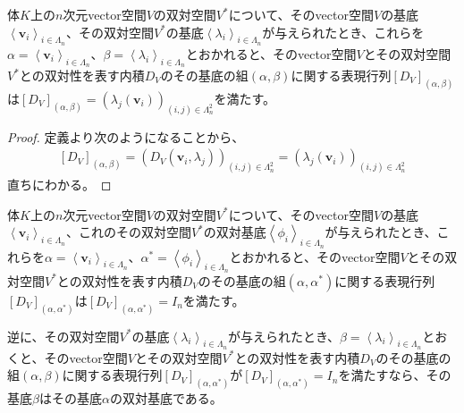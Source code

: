\documentclass[dvipdfmx]{jsarticle}
\begin{document}
\begin{thm}\label{2.4.3.11}
体$K$上の$n$次元vector空間$V$の双対空間$V^{*}$について、そのvector空間$V$の基底$\left\langle \mathbf{v}_{i} \right\rangle_{i \in \varLambda_{n}}$、その双対空間$V^{*}$の基底$\left\langle \lambda_{i} \right\rangle_{i \in \varLambda_{n}}$が与えられたとき、これらを$\alpha = \left\langle \mathbf{v}_{i} \right\rangle_{i \in \varLambda_{n}}$、$\beta = \left\langle \lambda_{i} \right\rangle_{i \in \varLambda_{n}}$とおかれると、そのvector空間$V$とその双対空間$V^{*}$との双対性を表す内積$D_{V}$のその基底の組$(\alpha,\beta)$に関する表現行列$\left[ D_{V} \right]_{(\alpha,\beta)}$は$\left[ D_{V} \right]_{(\alpha,\beta)} = \left( \lambda_{j}\left( \mathbf{v}_{i} \right) \right)_{(i,j) \in \varLambda_{n}^{2}}$を満たす。
\end{thm}
\begin{proof}
定義より次のようになることから、
\begin{align*}
\left[ D_{V} \right]_{(\alpha,\beta)} = \left( D_{V}\left( \mathbf{v}_{i},\lambda_{j} \right) \right)_{(i,j) \in \varLambda_{n}^{2}} = \left( \lambda_{j}\left( \mathbf{v}_{i} \right) \right)_{(i,j) \in \varLambda_{n}^{2}}
\end{align*}
直ちにわかる。
\end{proof}
\begin{thm}\label{2.4.3.12}
体$K$上の$n$次元vector空間$V$の双対空間$V^{*}$について、そのvector空間$V$の基底$\left\langle \mathbf{v}_{i} \right\rangle_{i \in \varLambda_{n}}$、これのその双対空間$V^{*}$の双対基底$\left\langle \phi_{i} \right\rangle_{i \in \varLambda_{n}}$が与えられたとき、これらを$\alpha = \left\langle \mathbf{v}_{i} \right\rangle_{i \in \varLambda_{n}}$、$\alpha^{*} = \left\langle \phi_{i} \right\rangle_{i \in \varLambda_{n}}$とおかれると、そのvector空間$V$とその双対空間$V^{*}$との双対性を表す内積$D_{V}$のその基底の組$\left( \alpha,\alpha^{*} \right)$に関する表現行列$\left[ D_{V} \right]_{\left( \alpha,\alpha^{*} \right)}$は$\left[ D_{V} \right]_{\left( \alpha,\alpha^{*} \right)} = I_{n}$を満たす。\par
逆に、その双対空間$V^{*}$の基底$\left\langle \lambda_{i} \right\rangle_{i \in \varLambda_{n}}$が与えられたとき、$\beta = \left\langle \lambda_{i} \right\rangle_{i \in \varLambda_{n}}$とおくと、そのvector空間$V$とその双対空間$V^{*}$との双対性を表す内積$D_{V}$のその基底の組$(\alpha,\beta)$に関する表現行列$\left[ D_{V} \right]_{\left( \alpha,\alpha^{*} \right)}$が$\left[ D_{V} \right]_{\left( \alpha,\alpha^{*} \right)} = I_{n}$を満たすなら、その基底$\beta$はその基底$\alpha$の双対基底である。
\end{thm}
\end{document}
